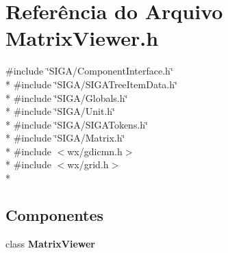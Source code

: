 \section{Referência do Arquivo Matrix\+Viewer.\+h}
\label{_matrix_viewer_8h}
{\ttfamily \#include \char`\"{}S\+I\+G\+A/\+Component\+Interface.\+h\char`\"{}}\\*
{\ttfamily \#include \char`\"{}S\+I\+G\+A/\+S\+I\+G\+A\+Tree\+Item\+Data.\+h\char`\"{}}\\*
{\ttfamily \#include \char`\"{}S\+I\+G\+A/\+Globals.\+h\char`\"{}}\\*
{\ttfamily \#include \char`\"{}S\+I\+G\+A/\+Unit.\+h\char`\"{}}\\*
{\ttfamily \#include \char`\"{}S\+I\+G\+A/\+S\+I\+G\+A\+Tokens.\+h\char`\"{}}\\*
{\ttfamily \#include \char`\"{}S\+I\+G\+A/\+Matrix.\+h\char`\"{}}\\*
{\ttfamily \#include $<$wx/gdicmn.\+h$>$}\\*
{\ttfamily \#include $<$wx/grid.\+h$>$}\\*
\subsection*{Componentes}
\begin{DoxyCompactItemize}
\item 
class {\bf Matrix\+Viewer}
\end{DoxyCompactItemize}
